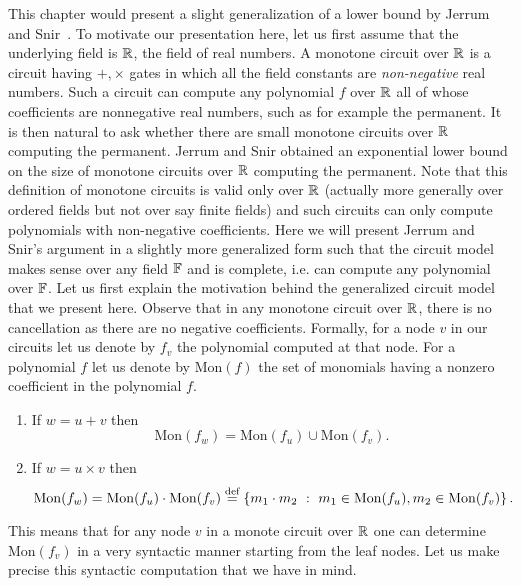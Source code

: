\documentclass[12pt]{report}
\newcommand{\Mon}{\mathrm{Mon}}
\begin{document}
This chapter would present a slight generalization 
	of a lower bound by Jerrum and Snir~\cite{js82}. 
	To motivate our presentation here, let us first 
	assume that the underlying field is $\mathbb{R}$, the 
	field of real numbers. A monotone circuit over 
	$\mathbb{R}$ is a circuit having $+, \times$ gates in 
	which all the field constants are {\em non-negative} 
	real numbers. Such a circuit can compute any 
	polynomial $f$ over $\mathbb{R}$ all of whose 
	coefficients are nonnegative real numbers, such as 
	for example the permanent. It is then natural to ask 
	whether there are small monotone circuits over $\mathbb{R}$ 
	computing the permanent. Jerrum and Snir \cite{js82}
	obtained an exponential lower bound on the size 
	of monotone circuits over $\mathbb{R}$ computing the 
	permanent. Note that this	definition of monotone 
	circuits is valid only over $\mathbb{R}$ (actually more 
	generally over ordered fields but not over say finite 
	fields) and such circuits can only compute polynomials 
	with non-negative coefficients. Here we will present 
	Jerrum and Snir's argument in a slightly more 
	generalized form such that the circuit model makes 
	sense over any field $\mathbb{F}$ and is complete, i.e. 
	can compute any polynomial over $\mathbb{F}$. Let us first 
	explain the motivation behind the generalized circuit
	model that we present here. Observe that in any monotone 
	circuit over $\mathbb{R}$, there is no cancellation as there 
	are no negative coefficients. Formally, for a node $v$ 
	in our circuits let us denote by $f_{v}$ the polynomial 
	computed at that node. For a polynomial $f$ let us denote 
	by $\Mon(f)$ the set of monomials having a nonzero 
	coefficient in the polynomial $f$. 
		\begin{enumerate}
		
			\item If $w = u + v$ then 
				$$ \Mon(f_{w}) = \Mon(f_{u}) \cup \Mon(f_{v}). $$
			
			\item If $w = u \times v$ then
				$$ \Mon(f_{w}) = \Mon(f_{u}) \cdot \Mon(f_{v}) \eqdef \setdef{m_1\cdot m_2}{m_1 \in \Mon(f_{u}), m_2\in \Mon(f_{v})}. $$
			
		\end{enumerate}
	This means that for any node $v$ in a monote circuit over 
	$\mathbb{R}$ one can determine $\Mon(f_{v})$ in a very syntactic 
	manner starting from the leaf nodes. Let us make precise 
	this syntactic computation that we have in mind.
	
\end{document}
